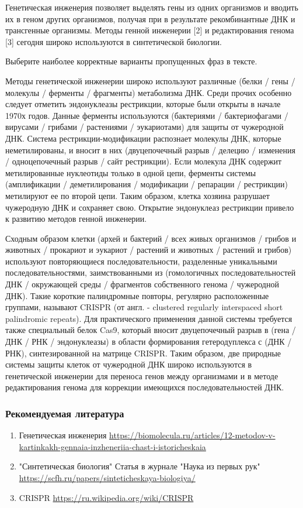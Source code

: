 
Генетическая инженерия позволяет выделять гены из одних организмов и вводить их в геном других организмов, получая при в результате рекомбинантные ДНК и трансгенные организмы. Методы генной инженерии [2] и редактирования генома [3] ﻿сегодня ﻿﻿широко используются в синтетической биологии. 

Выберите наиболее корректные варианты пропущенных фраз в тексте.

Методы генетической инженерии широко используют различные (белки / гены / молекулы / ферменты / фрагменты) 
метаболизма ДНК. Среди прочих особенно следует отметить эндонуклеазы рестрикции, которые были открыты в начале 1970х годов. Данные ферменты используются 
(бактериями / бактериофагами / вирусами / грибами / растениями / эукариотами) 
для защиты от чужеродной ДНК. Система рестрикции-модификации распознает молекулы ДНК, которые неметилированы, и вносит в них 
(двуцепочечный разрыв / делецию / изменения / одноцепочечный разрыв / сайт рестрикции). Если молекула ДНК содержит метилированные нуклеотиды только в одной цепи, ферменты системы 
(амплификации / деметилирования / модификации / репарации / рестрикции) 
метилируют ее по второй цепи. Таким образом, клетка хозяина разрушает чужеродную ДНК и сохраняет свою. Открытие эндонуклеаз рестрикции привело к развитию методов генной инженерии. 

Сходным образом клетки (архей и бактерий / всех живых организмов / грибов и животных / прокариот и эукариот / растений и животных / растений и грибов) 
используют повторяющиеся последовательности, разделенные уникальными последовательностями, заимствованными из 
(гомологичных последовательностей ДНК / окружающей среды / фрагментов собственного генома / чужеродной ДНК). Такие короткие палиндромные повторы, регулярно расположенные группами, называют CRISPR (от англ. - clustered regularly interspaced short palindromic repeats). Для практического применения данной системы требуется также специальный белок Cas9, который вносит двуцепочечный разрыв в 
(гена / ДНК / РНК / эндонуклеазы) в области формирования гетеродуплекса с (ДНК / РНК), синтезированной на матрице CRISPR. Таким образом, две природные системы защиты клеток от чужеродной ДНК широко используются в генетической инженерии для переноса генов между организмами и в методе редактирования генома для коррекции имеющихся последовательностей ДНК. 

\subsubsection*{Рекомендуемая литература}

\begin{enumerate}
    \item Генетическая инженерия \url{https://biomolecula.ru/articles/12-metodov-v-kartinkakh-gennaia-inzheneriia-chast-i-istoricheskaia}
    \item "Синтетическая биология" Статья в журнале "Наука из первых рук" \url{https://scfh.ru/papers/sinteticheskaya-biologiya/}
    \item CRISPR \url{https://ru.wikipedia.org/wiki/CRISPR}
\end{enumerate}